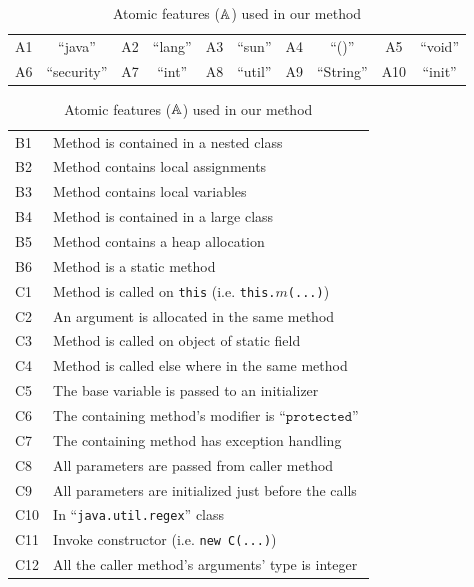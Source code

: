 


\begin{table}[ht]
	\renewcommand{\arraystretch}{1}
	\caption{Atomic features ($\mathbb{A}$) used in our method}\label{tbl:obj2cfa:features}
	\centering
	\footnotesize
		 \begin{tabular}{c c c c c c c c c c }
			\toprule
			 A1  & ``java''    & A2  & ``lang''     & A3 & ``sun'' & A4 & ``()'' & A5  & ``void''\\ 
			 A6  & ``security'' & A7 & ``int''      & A8 & ``util'' & A9  & ``String'' &  A10 & ``init''\\ \bottomrule
		 \end{tabular}
		\begin{tabular}{ l l }
			 B1 &  Method is contained in a nested class               \\      
			 B2 & Method contains local assignments                    \\ 
			 B3 & Method contains local variables                      \\ 
			 B4 & Method is contained in a large class                      \\ 
			 B5 & Method contains a heap allocation         \\
			 B6 & Method is a static method         \\
			\midrule
			C1 & Method is called on \texttt{this} (i.e. \texttt{this.$m$(...)}) \\
			C2 & An argument is allocated in the same method      \\ 
			C3 & Method is called on object of static field					\\
			C4 & Method is called else where in the same method \\
			C5 & The base variable is passed to an initializer  \\
			C6 & The containing method's modifier is ``$\texttt{protected}$''        \\
			C7 & The containing method has exception handling        \\
			C8 & All  parameters are passed from caller method\\
			C9 & All  parameters are initialized just before the calls\qquad\,\,\\
			C10 & In ``{\tt java.util.regex}'' class\\
			C11 & Invoke constructor (i.e. \texttt{new C(...)}) \\
			C12 & All the caller method's arguments' type is integer\\

\end{tabular}
\end{table}
